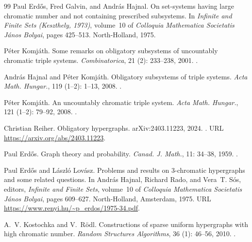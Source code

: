 \documentclass[a4paper,11pt,reqno]{amsart}
\theoremstyle{plain}
\theoremstyle{definition}
\theoremstyle{remark}
\begin{document}
\begin{thebibliography}{99}
Paul Erd{\H{o}}s, Fred Galvin, and Andr{\'a}s Hajnal.
\newblock On set-systems having large chromatic number and not containing
  prescribed subsystems.
\newblock In \emph{Infinite and Finite Sets (Keszthely, 1973)}, volume~10 of
  \emph{Colloquia Mathematica Societatis J{\'a}nos Bolyai}, pages 425--513.
  North-Holland, 1975.

P{\'e}ter Komj{\'a}th.
\newblock Some remarks on obligatory subsystems of uncountably chromatic triple
  systems.
\newblock \emph{Combinatorica}, 21 (2): 233--238, 2001.
\newblock {}.

Andr{\'a}s Hajnal and P{\'e}ter Komj{\'a}th.
\newblock Obligatory subsystems of triple systems.
\newblock \emph{Acta Math. Hungar.}, 119 (1--2):
  1--13, 2008.
\newblock {}.

P{\'e}ter Komj{\'a}th.
\newblock An uncountably chromatic triple system.
\newblock \emph{Acta Math. Hungar.}, 121 (1--2):
  79--92, 2008.
\newblock {}.

Christian Reiher.
\newblock Obligatory hypergraphs.
\newblock arXiv:2403.11223, 2024.
\newblock {}.
\newblock URL \url{https://arxiv.org/abs/2403.11223}.

Paul Erd{\H{o}}s.
\newblock Graph theory and probability.
\newblock \emph{Canad. J. Math.}, 11: 34--38, 1959.
\newblock {}.

Paul Erd{\H{o}}s and L{\'a}szl{\'o} Lov{\'a}sz.
\newblock Problems and results on 3-chromatic hypergraphs and some related questions.
\newblock In Andr{\'a}s Hajnal, Richard Rado, and Vera~T. S{\'o}s, editors,
  \emph{Infinite and Finite Sets}, volume~10 of \emph{Colloquia Mathematica
  Societatis J{\'a}nos Bolyai}, pages 609--627. North-Holland, Amsterdam, 1975.
\newblock URL \url{https://www.renyi.hu/~p_erdos/1975-34.pdf}.

A.~V. Kostochka and V.~R{\"o}dl.
\newblock Constructions of sparse uniform hypergraphs with high chromatic number.
\newblock \emph{Random Structures Algorithms}, 36 (1): 46--56, 2010.
\newblock {}.


\end{thebibliography}
\end{document}
